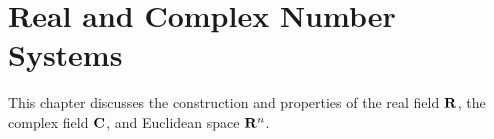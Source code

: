 \chapter{Real and Complex Number Systems}\label{chap:number-systems}

This chapter discusses the construction and properties of the real field $\mathbf R$, the complex field $\mathbf C$, and Euclidean space $\mathbf R^n$.

\begin{comment}
\section{Natural Numbers}
In Peano's development, it is assumed that there is a set $\NN$ (the natural numbers) of undefined objects with a distinguished element $1$ such that
\begin{enumerate}[label=(\roman*)]
\item $1$ is a natural number; that is $1\in\NN$;
\item every $n\in\NN$ has a successor $S(n)\in\NN$;
\item for every $n$, $S(n)\neq1$ (there is no number with 1 as successor)
\item if $S(n)=S(m)$, then $n=m$;
\item if $A$ is a set of natural numbers such that $1\in A$ and $n\in A\implies S(n)\in A$, then $A$ contains all natural numbers.
\end{enumerate}
These are known as \vocab{Peano's axioms}.

\begin{theorem}[Archimedean property of $\NN$]
$\NN$ is not bounded above.
\end{theorem}

\begin{proof}
Suppose, for a contradiction, that $\NN$ is bounded above. Then $\NN$ is non-empty and bounded above, so by completeness (of $\RR$) $\NN$ has a supremum.

By the Approximation property with $\epsilon=\frac{1}{2}$, there is a natural number $n\in\NN$ such that $\sup\NN-\frac{1}{2}<n\le\sup\NN$.

Now $n+1\in\NN$ and $n+1>\sup\NN$. This is a contradiction.
\end{proof}
\pagebreak

\section{Integers}
\begin{definition}
For $(a,b),(c,d)\in\NN\times\NN$, we define a relation
\[(a,b)\sim(c,d)\iff a+d=b+c.\]
\end{definition}


\end{comment}
